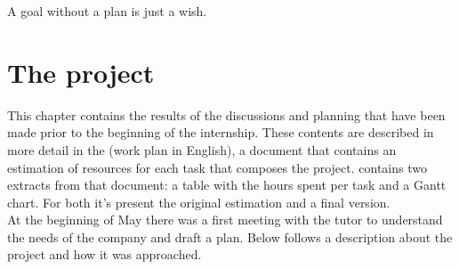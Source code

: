 \begin{savequote}[75mm]
A goal without a plan is just a wish.
\end{savequote}

\chapter{The project}
\label{chapter_2}

This chapter contains the results of the discussions and planning that have been made prior to the beginning of the internship.
These contents are described in more detail in the  (work plan in English), a document that contains an estimation of resources for each task that composes the project.
 contains two extracts from that document: a table with the hours spent per task and a Gantt chart.
For both it's present the original estimation and a final version.\\
At the beginning of May there was a first meeting with the tutor to understand the needs of the company and draft a plan.
Below follows a description about the project and how it was approached.

